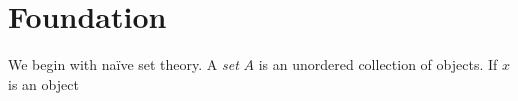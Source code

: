 
\chapter{Foundation}

We begin with na\"ive set theory. A \emph{set} $A$ is an unordered collection of objects. If $x$ is an object 


